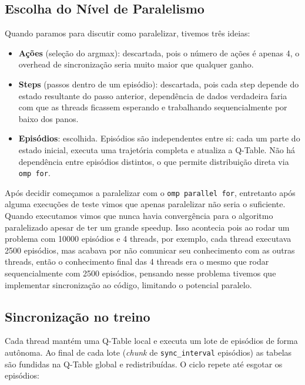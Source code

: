 \documentclass[12pt]{article}
\begin{document}
\subsection{Escolha do Nível de Paralelismo}
\label{sec:orgf4b6894}

Quando paramos para discutir como paralelizar, tivemos três ideias:

\begin{itemize}
\item \textbf{Ações} (seleção do argmax): descartada, pois o número de ações é
apenas 4, o overhead de sincronização seria muito maior que qualquer
ganho.
\item \textbf{Steps} (passos dentro de um episódio): descartada, pois cada step depende
do estado resultante do passo anterior, dependência de dados
verdadeira faria com que as threads ficassem esperando e trabalhando
sequencialmente por baixo dos panos.
\item \textbf{Episódios}: escolhida. Episódios são independentes entre si: cada um parte
do estado inicial, executa uma trajetória completa e atualiza a Q-Table.
Não há dependência entre episódios distintos, o que permite distribuição
direta via \texttt{omp for}.
\end{itemize}


Após decidir começamos a paralelizar com o \texttt{omp parallel for},
entretanto após alguma execuções de teste vimos que apenas paralelizar
não seria o suficiente. Quando executamos vimos que nunca havia
convergência para o algoritmo paralelizado apesar de ter um grande
speedup. Isso acontecia pois ao rodar um problema com 10000 episódios
e 4 threads, por exemplo, cada thread executava 2500 episódios, mas
acabava por não comunicar seu conhecimento com as outras threads,
então o conhecimento final das 4 threads era o mesmo que rodar
sequencialmente com 2500 episódios, pensando nesse problema tivemos
que implementar sincronização ao código, limitando o potencial
paralelo.
\subsection{Sincronização no treino}
\label{sec:orgb346b31}

Cada thread mantém uma Q-Table local e executa um lote de episódios de
forma autônoma. Ao final de cada lote (\emph{chunk} de \texttt{sync\_interval}
episódios) as tabelas são fundidas na Q-Table global e
redistribuídas. O ciclo repete até esgotar os episódios:
\end{document}
